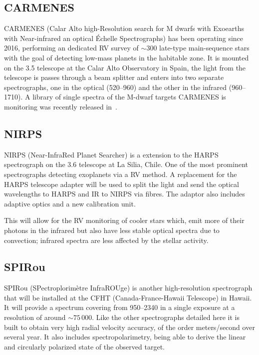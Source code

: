 \subsection{CARMENES}
\label{subsec:carmenes}
{CARMENES} (Calar Alto high-Resolution search for M dwarfs with Exoearths with Near-infrared an optical \'Echelle Spectrographs) has been operating since 2016, performing an dedicated RV survey of \(\sim300\) late-type main-sequence stars with the goal of detecting low-mass planets in the habitable zone.
It is mounted on the 3.5\m{} telescope at the Calar Alto Observatory in Spain, the light from the telescope is passes through a beam splitter and enters into two separate spectrographs, one in the optical (520--960\nm{}) and the other in the infrared (960--1710\nm{}).
A library of single spectra of the {M-dwarf} targets {CARMENES} is monitoring was recently released in~\citep{reiners_carmenes_2018}.

\subsection{NIRPS}
\label{subsec:nirps}
{NIRPS} (Near-InfraRed Planet Searcher) is a \nir{} extension to the {HARPS} spectrograph on the 3.6\m{} telescope at La Silia, Chile.
One of the most prominent spectrographs detecting exoplanets via a RV method.
A replacement for the {HARPS} telescope adapter will be used to split the light and send the optical wavelengths to {HARPS} and {IR} to {NIRPS} via fibres.
The adaptor also includes adaptive optics and a new calibration unit.

This will allow for the RV monitoring of cooler stars which, emit more of their photons in the infrared but also have less stable optical spectra due to convection; infrared spectra are less affected by the stellar activity.

\subsection{SPIRou}
\label{subsec:spirou}
{SPIRou} (SPectroplorim\`etre InfraROUge) is another high-resolution \nir{} spectrograph that will be installed at the {CFHT} (Canada-France-Hawaii Telescope) in Hawaii.
It will provide a spectrum covering from 950--2340\nm{} in a single exposure at a resolution of around \(\sim75\,000\).
Like the other spectrographs detailed here it is built to obtain very high radial velocity accuracy, of the order meters/second over several year.
It also includes spectropolarimetry, being able to derive the linear and circularly polarized state of the observed target.


